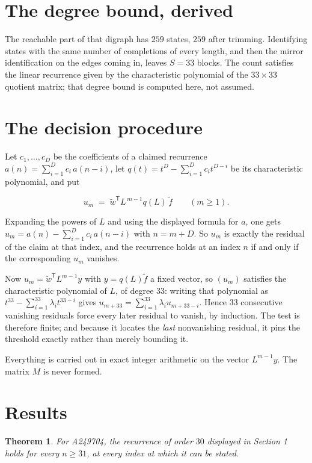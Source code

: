 \documentclass[11pt]{article}
\newtheorem{theorem}{Theorem}
\theoremstyle{definition}
\begin{document}
\section{The degree bound, derived}

The reachable part of that digraph has $259$ states, $259$ after trimming. Identifying states with the same number of completions of every length, and then the mirror identification on the edges coming in, leaves $S = 33$ blocks. The count satisfies the linear recurrence given by the characteristic polynomial of the $33\times33$ quotient matrix; that degree bound is computed here, not assumed.

\section{The decision procedure}

Let $c_1,\dots,c_D$ be the coefficients of a claimed recurrence $a(n) = \sum_{i=1}^{D} c_i\,a(n-i)$, let $q(t) = t^{D} - \sum_{i=1}^{D} c_i t^{D-i}$ be its characteristic polynomial, and put

\[u_m \;=\; \tilde w^{\mathsf T} L^{\,m-1} q(L)\,\tilde f \qquad (m \ge 1).\]

Expanding the powers of $L$ and using the displayed formula for $a$, one gets $u_m = a(n) - \sum_{i=1}^{D} c_i\,a(n-i)$ with $n = m + D$. So $u_m$ is exactly the residual of the claim at that index, and the recurrence holds at an index $n$ if and only if the corresponding $u_m$ vanishes.

Now $u_m = \tilde w^{\mathsf T} L^{m-1} y$ with $y = q(L)\tilde f$ a fixed vector, so $(u_m)$ satisfies the characteristic polynomial of $L$, of degree $33$: writing that polynomial as $t^{33} - \sum_{i=1}^{33} \lambda_i t^{33-i}$ gives $u_{m+33} = \sum_{i=1}^{33} \lambda_i u_{m+33-i}$. Hence $33$ consecutive vanishing residuals force every later residual to vanish, by induction. The test is therefore finite; and because it locates the {\itshape last} nonvanishing residual, it pins the threshold exactly rather than merely bounding it.

Everything is carried out in exact integer arithmetic on the vector $L^{m-1}y$. The matrix $M$ is never formed.

\section{Results}

\begin{theorem} For A249704, the recurrence of order $30$ displayed in Section 1 holds for every $n \ge 31$, at every index at which it can be stated.\end{theorem}
\end{document}
